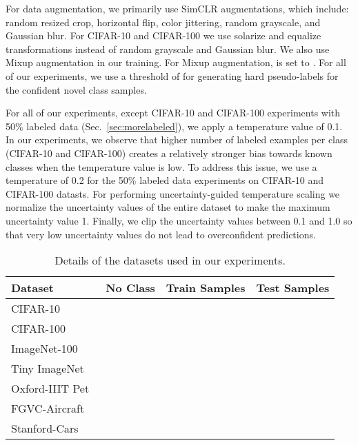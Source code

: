 \documentclass[runningheads]{eccv2022submission}
\begin{document}
For data augmentation, we primarily use SimCLR\cite{chen2020simple} augmentations, which include: random resized crop, horizontal flip, color jittering, random grayscale, and Gaussian blur. For CIFAR-10 and CIFAR-100 we use solarize and equalize transformations instead of random grayscale and Gaussian blur. We also use Mixup augmentation in our training. For Mixup \cite{zhang2018mixup} augmentation,  is set to . For all of our experiments, we use a threshold of  for generating hard pseudo-labels for the confident novel class samples.     

For all of our experiments, except CIFAR-10 and CIFAR-100 experiments with 50\% labeled data (Sec.~\ref{sec:morelabeled}), we apply a temperature value of 0.1. In our experiments, we observe that higher number of labeled examples per class (CIFAR-10 and CIFAR-100) creates a relatively stronger bias towards known classes when the temperature value is low. To address this issue, we use a temperature of 0.2 for the 50\% labeled data experiments on CIFAR-10 and CIFAR-100 datasts. For performing uncertainty-guided temperature scaling we normalize the uncertainty values of the entire dataset to make the maximum uncertainty value 1. Finally, we clip the uncertainty values between 0.1 and 1.0 so that very low uncertainty values do not lead to overconfident predictions. 
\begin{table*}[h]
\caption{Details of the datasets used in our experiments.}
\label{tab:dataset}
\begin{center}\setlength{\tabcolsep}{4pt}
\small
\begin{tabular}{lccc}
\hline



\textbf{Dataset} & \textbf{No Class} & \textbf{Train Samples} & \textbf{Test Samples}
 \\




\hline
CIFAR-10~\cite{cifar10} &  &  &  \\
CIFAR-100~\cite{cifar100} &  &  &  \\
ImageNet-100~\cite{russakovsky2015imagenet} &  &  &  \\
Tiny ImageNet~\cite{le2015tiny} &  &  & \\
Oxford-IIIT Pet~\cite{parkhi12a} &  &  & \\
FGVC-Aircraft~\cite{maji13fine-grained} &  &  &  \\
Stanford-Cars~\cite{KrauseStarkDengFei-Fei_3DRR2013} &  &  & \\ \hline 



\end{tabular}
\end{center}
\end{table*}
\end{document}
